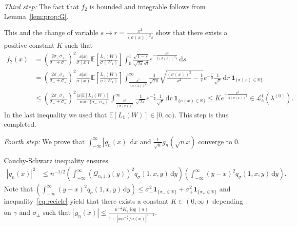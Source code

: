 \documentclass[12pt]{article}
\numberwithin{equation}{section}
\theoremstyle{definition}
\theoremstyle{remark}
\newcommand{\RR}{\mathbb{R}}
\newcommand{\EE}{\mathbb{E}}
\newcommand{\cQ}{\mathcal{Q}}
\newcommand{\ind}[1]{\mathbf{1}_{#1}}
\newcommand{\vd}{\,\mathrm{d}}
\newcommand{\Lgb}[1]{\mathcal{L}^{1}_{b}(\lambda^{(#1)})}
\begin{document}
{\it Third step:} The fact that $f_2$ is bounded and integrable follows from Lemma~\ref{lem:prop:G}.

This and the change of variable $s \mapsto r= \frac{x^2}{(\sigma(x))^2 s}$ show that there exists a positive constant $K$ 
such that
\begin{equation}
\begin{split} 
	f_2(x)  
	& = \left(\frac{2 \sigma_-\sigma_+}{\sigma_-+\sigma_+}\right)^{\! 2} \frac{x |x|}{\sigma(x)} \EE\!\left[ \frac{L_1(W)}{\sigma(W_1)} \right] 
	\int_0^1  \frac{\sqrt{1-s}}{\sqrt{2\pi} s^\frac32} e^{-\frac{x^2}{2 (\sigma(x))^2 s}} 
	\! \vd s
	\\
	& = \left(\frac{2 \sigma_-\sigma_+}{\sigma_-+\sigma_+}\right)^{\! 2} \frac{x |x|}{\sigma(x)} \EE\!\left[ \frac{L_1(W)}{\sigma(W_1)} \right] 
	\int_{\frac{x^2}{(\sigma(x))^2}}^\infty  \frac1{\sqrt{2\pi}}
 \sqrt{\frac{(\sigma(x))^2}{x^2}-\frac1r} e^{-\frac{r}{2}} 
	\frac1{\sqrt{r}}\! \vd r \ \ind{\{\sigma(x)\in \RR\}}
	\\
	& \leq \left(\frac{2 \sigma_-\sigma_+}{\sigma_-+\sigma_+}\right)^{\! 2} \frac{|x| \EE\!\left[L_1(W)\right] }{\min\{\sigma_-,\sigma_+\}}
	\int_{\frac{x^2}{(\sigma(x))^2}}^\infty  \frac1{\sqrt{2\pi}}
  e^{-\frac{r}{2}} 
	\frac1{\sqrt{r}}\! \vd r \ \ind{\{\sigma(x)\in \RR\}}
	\leq K e^{-\frac{x^2}{4(\sigma(x))^2}} \in \Lgb{0}.
\end{split}
\end{equation}
In the last inequality we used that $\EE\!\left[ L_1(W) \right] \in [0,\infty)$.
This step is thus completed.

{\it Fourth step:} We prove that $\int_{-\infty}^{\infty} |g_n(x)| \vd x$ 
and 
$\frac1{\sqrt{n}} g_n(\sqrt{n} x)$ converge to 0.

Cauchy-Schwarz inequality 
ensures
\begin{equation}
\begin{split}
	|g_n(x)|^2 
	& \leq n^{-1/2} \left( \int_{-\infty}^{\infty} (\cQ_{n,1,0}(y))^2 q_\sigma (1,x,y) \vd y\right) \left(\int_{-\infty}^{\infty} (y-x)^2 q_\sigma(1,x,y) \vd y\right).
\end{split}
\end{equation}
Note that
$
	\left(\int_{-\infty}^{\infty} (y-x)^2 q_\sigma(1,x,y) \vd y\right) 
\leq \sigma_-^2 \ind{\{\sigma_-\in \RR\}} +\sigma_+^2 \ind{\{\sigma_+\in \RR\}}
$ 
and inequality~\eqref{eq:recicle}
yield that there exists a constant $K\in (0,\infty)$ depending on $\gamma$ and $\sigma_\pm$ such that
$
 |g_n(x)|
	\leq  \frac{n^{-\frac14} K_2 \log (n)}{1+|x n^{-\frac18}/\sigma(x)|^{\gamma-1}}.
$
\end{document}
